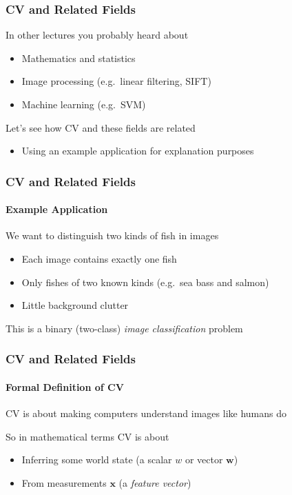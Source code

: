 \documentclass[xetex,professionalfont]{beamer}
\renewcommand{\vec}[1]{\ensuremath{\mathbf{#1}}}
\newcommand{\vw}{\vec{w}}
\newcommand{\vx}{\vec{x}}
\begin{document}

\begin{frame}
\frametitle{CV and Related Fields}

In other lectures you probably heard about
\begin{itemize}
    \item Mathematics and statistics
    \item Image processing (e.g.\ linear filtering, SIFT)
    \item Machine learning (e.g.\ SVM)
\end{itemize}

\bigskip
Let's see how CV and these fields are related
\begin{itemize}
    \item Using an example application for explanation purposes
\end{itemize}

\end{frame}


\begin{frame}
\frametitle{CV and Related Fields}
\framesubtitle{Example Application}

We want to distinguish two kinds of fish in images
\begin{itemize}
    \item Each image contains exactly one fish
    \item Only fishes of two known kinds (e.g.\ sea bass and salmon) %
    \item Little background clutter
\end{itemize}

\bigskip
This is a binary (two-class) \emph{image classification} problem

\end{frame}


\begin{frame}
\frametitle{CV and Related Fields}
\framesubtitle{Formal Definition of CV}

CV is about making computers understand images like humans do

\bigskip
So in mathematical terms CV is about
\begin{itemize}
    \item Inferring some world state (a scalar $w$ or vector $\vw$)
    \item From measurements $\vx$ (a \emph{feature vector})
\end{itemize}

\end{frame}
\end{document}
